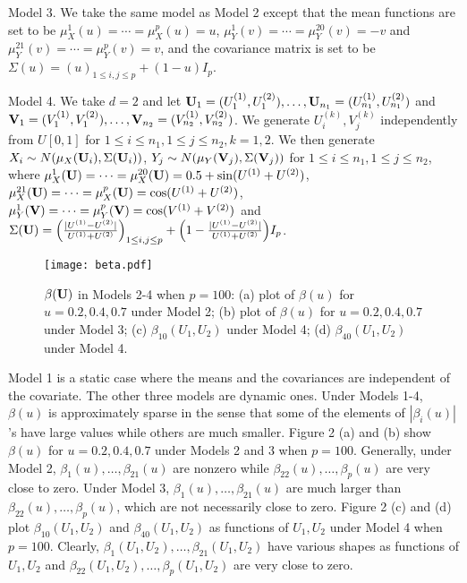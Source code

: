 \documentclass[11pt]{article}
\theoremstyle{definition}
\begin{document}
 {\rm Model 3.} We take the same model as Model 2 except that the mean functions are set to be $\mu^1_X(u)=\cdots=\mu^p_X(u)=u$, $\mu^1_Y(v)=\cdots=\mu^{20}_Y(v)=-v$ and $\mu^{21}_Y(v)=\cdots=\mu^p_Y(v)=v$, and the covariance matrix is set to be $\Sigma(u)=(u)_{1\leq i,j\leq p}+(1-u)I_{p}$.
 
 
 {\rm Model 4.} We take $d=2$ and let ${\bf U}_1=(U^{(1)}_1,U^{(2)}_1), \ldots, {\bf U}_{n_1}=(U^{(1)}_{n_1},U^{(2)}_{n_1})$ and ${\bf V}_1=(V^{(1)}_1,V^{(2)}_1), \ldots, {\bf V}_{n_2}=(V^{(1)}_{n_2},V^{(2)}_{n_2})$. We generate $U_{i}^{(k)}, V_{j}^{(k)}$ independently from $U[0,1]$ for $1\leq i\leq n_1,  1\leq j \leq n_2, k=1,2$.  We then generate $X_i\sim N(\mu_X({\bf U}_i),\Sigma({\bf U}_i))$, $Y_j\sim N(\mu_Y({\bf V}_j),\Sigma({\bf V}_j))$ for $1\leq i\leq n_1, 1\leq j\leq n_2$, where
 $\mu^1_X({\bf U})=\cdots=\mu^{20}_X({\bf U})=0.5+\sin(U^{(1)}+U^{(2)})$,  $\mu^{21}_X({\bf U})=\cdots=\mu^{p}_X({\bf U})=\cos(U^{(1)}+U^{(2)})$,  $\mu^1_Y({\bf V})=\cdots=\mu^{p}_Y({\bf V})=\cos(V^{(1)}+V^{(2)})$ and $\Sigma({\bf U})=\Big(\frac{|U^{(1)}-U^{(2)}|}{U^{(1)}+U^{(2)}}\Big)_{1\leq i,j\leq p}+\Big(1-\frac{|U^{(1)}-U^{(2)}|}{U^{(1)}+U^{(2)}}\Big)I_{p}$.
 
 \begin{figure}[htbp]
 	\centering
 	\texttt{[image: beta.pdf]}
 	\caption{$\beta({\bf U})$ in Models 2-4 when $p=100$: (a) plot of $\beta(u)$ for $u=0.2, 0.4, 0.7$ under Model 2; (b) plot of $\beta(u)$ for $u=0.2, 0.4, 0.7$ under Model 3; (c) $\beta_{10}(U_1,U_2)$ under Model 4; (d) $\beta_{40}(U_1,U_2)$ under Model 4.}\label{fig2}
 \end{figure}
 
 
 
 Model 1 is a static case where the means and the covariances are independent of the covariate. The other three models are dynamic ones. Under Models 1-4, $\beta(u)$ is approximately sparse in the sense that some of the elements of $|\beta_i(u)|$'s have large values while others are much smaller. Figure 2 (a) and (b) show $\beta(u)$ for $u=0.2,0.4,0.7$ under Models 2 and 3 when $p=100$. Generally, under Model 2, $\beta_1(u),\ldots,\beta_{21}(u)$ are nonzero while $\beta_{22}(u),\ldots,\beta_p(u)$ are very close to zero. Under Model 3, $\beta_1(u),\ldots,\beta_{21}(u)$ are much larger than $\beta_{22}(u),\ldots,\beta_p(u)$, which are not necessarily close to zero. Figure 2 (c) and (d) plot $\beta_{10}(U_1,U_2)$ and $\beta_{40}(U_1,U_2)$ as functions of $U_1,U_2$ under Model 4 when $p=100$. Clearly, $\beta_{1}(U_1,U_2),\ldots, \beta_{21}(U_1,U_2)$ have various shapes as functions of $U_1, U_2$ and $\beta_{22}(U_1,U_2),\ldots, \beta_{p}(U_1,U_2)$ are very close to zero.
 
\end{document}

